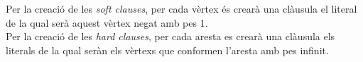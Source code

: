 \documentclass[../informe.tex]{subfiles}
\begin{document}
Per la creació de les \textit{soft clauses}, per cada vèrtex és crearà una clàusula el literal de la qual serà aquest vèrtex negat amb pes 1. \\

Per la creació de les \textit{hard clauses}, per cada aresta es crearà una clàusula els literals de la qual seràn els vèrtexs que conformen l'aresta amb pes infinit.
\end{document}
